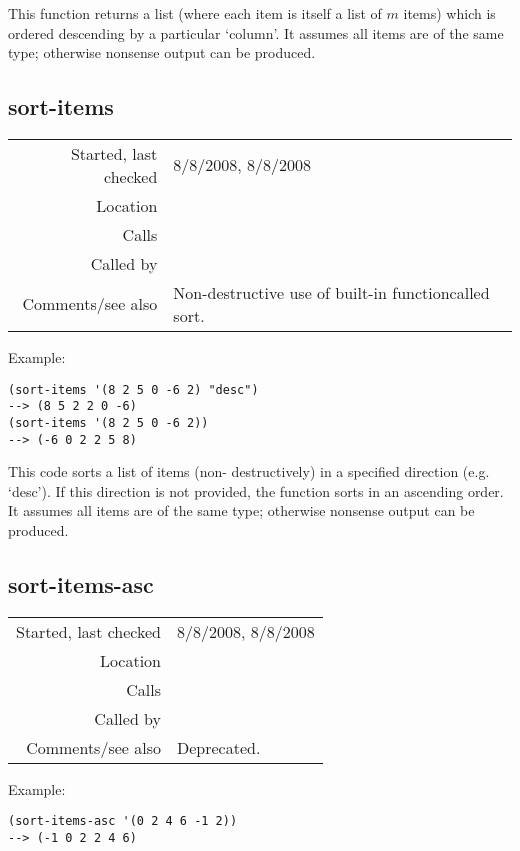 \noindent This function returns a list (where each
item is itself a list of $m$ items) which is ordered
descending by a particular `column'. It assumes all
items are of the same type; otherwise nonsense output
can be produced.


\subsection*{sort-items}\label{fun:sort-items}

\vspace{0.3cm}
\begin{tabular}{r|p{8cm}}
Started, last checked & 8/8/2008, 8/8/2008 \\
Location & \nameref{sec:sort-by} \\
Calls & \\
Called by & \\
Comments/see also & Non-destructive use of built-in function\newline called sort.
\end{tabular}

\vspace{0.5cm}
\noindent Example:
\begin{verbatim}
(sort-items '(8 2 5 0 -6 2) "desc")
--> (8 5 2 2 0 -6)
(sort-items '(8 2 5 0 -6 2))
--> (-6 0 2 2 5 8)
\end{verbatim}

\noindent This code sorts a list of items (non-
destructively) in a specified direction (e.g. `desc').
If this direction is not provided, the function sorts
in an ascending order. It assumes all items are of the
same type; otherwise nonsense output can be
produced.


\subsection*{sort-items-asc}\label{fun:sort-items-asc}

\vspace{0.3cm}
\begin{tabular}{r|p{8cm}}
Started, last checked & 8/8/2008, 8/8/2008 \\
Location & \nameref{sec:sort-by} \\
Calls & \\
Called by & \\
Comments/see also & Deprecated.
\end{tabular}

\vspace{0.5cm}
\noindent Example:
\begin{verbatim}
(sort-items-asc '(0 2 4 6 -1 2))
--> (-1 0 2 2 4 6)
\end{verbatim}

